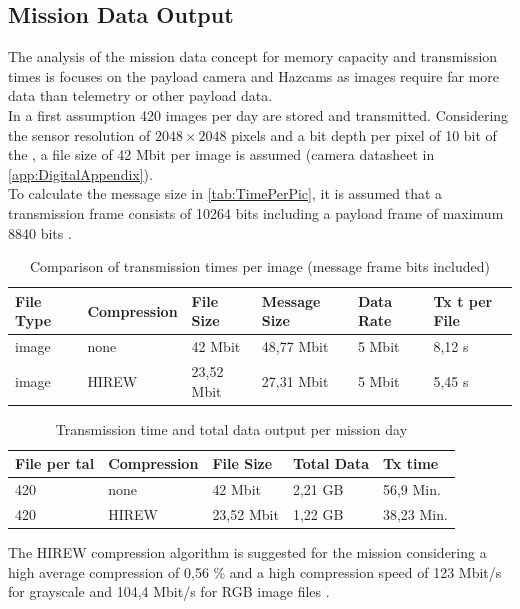 \subsection{Mission Data Output}
\label{app:MissionDataOutput}

The analysis of the mission data concept for memory capacity and transmission times is focuses on the payload camera and Hazcams as images require far more data than telemetry or other payload data. \\

In a first assumption 420 images per day are stored and transmitted. Considering the sensor resolution of $2048\times2048$ pixels and a bit depth per pixel of 10 bit of the , a file size of 42 Mbit per image is assumed (camera datasheet in \autoref{app:DigitalAppendix}).\\
To calculate the message size in \autoref{tab:TimePerPic}, it is assumed that a transmission frame consists of 10264 bits including a payload frame of maximum 8840 bits \cite{FLP}.   

\begin{table}[h]
\centering
\begin{tabular}{llllll}
File Type & Compression    & File Size  & Message Size & Data Rate & Tx t per File \\ \hline\hline
image     & none           & 42 Mbit    & 48,77 Mbit   & 5 Mbit    & 8,12 s        \\
image     & HIREW          & 23,52 Mbit & 27,31 Mbit   & 5 Mbit    & 5,45 s        \\ \hline
\end{tabular}
\caption{Comparison of transmission times per image (message frame bits included)}
\label{tab:TimePerPic}
\end{table}

\begin{table}[h]
\centering
\begin{tabular}{lllll}
File per tal & Compression & File Size  & Total Data & Tx time    \\ \hline\hline
420          & none        & 42 Mbit    & 2,21 GB    & 56,9 Min.  \\
420          & HIREW       & 23,52 Mbit & 1,22 GB    & 38,23 Min. \\ \hline
\end{tabular}
\caption{Transmission time and total data output per mission day}
\label{tab:Tx-tptal}
\end{table}

The HIREW compression algorithm is suggested for the mission considering a high average compression of 0,56 \% and a high compression speed of 123 Mbit/s for grayscale and 104,4 Mbit/s for RGB image files \cite{HIREW}. 

